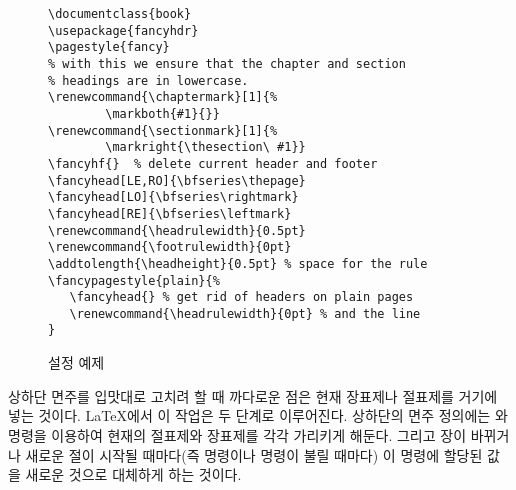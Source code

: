 \begin{figure}[!htbp]
\begin{lined}{\textwidth}
\begin{verbatim}
\documentclass{book}
\usepackage{fancyhdr}
\pagestyle{fancy}
% with this we ensure that the chapter and section
% headings are in lowercase.
\renewcommand{\chaptermark}[1]{%
        \markboth{#1}{}}
\renewcommand{\sectionmark}[1]{%
        \markright{\thesection\ #1}}
\fancyhf{}  % delete current header and footer
\fancyhead[LE,RO]{\bfseries\thepage}
\fancyhead[LO]{\bfseries\rightmark}
\fancyhead[RE]{\bfseries\leftmark}
\renewcommand{\headrulewidth}{0.5pt}
\renewcommand{\footrulewidth}{0pt}
\addtolength{\headheight}{0.5pt} % space for the rule
\fancypagestyle{plain}{%
   \fancyhead{} % get rid of headers on plain pages
   \renewcommand{\headrulewidth}{0pt} % and the line
}
\end{verbatim}
\end{lined}
\caption{ 설정 예제} \label{fancyhdr}
\end{figure}

상하단 면주를 입맛대로 고치려 할 때 까다로운 점은 현재 장표제나 절표제를%
거기에 넣는 것이다. \LaTeX 에서 이 작업은 두 단계로 이루어진다. 상하단의 면주 정의에는 와  명령을 이용하여 현재의 절표제와 장표제를 각각 가리키게 해둔다.
그리고 장이 바뀌거나 새로운 절이 시작될 때마다(즉  명령이나  명령이 불릴 때마다) 이 명령에 할당된 값을 새로운 것으로 대체하게 하는 것이다.

